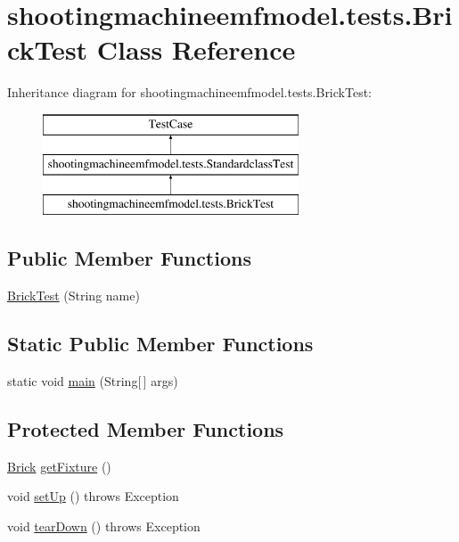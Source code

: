 \hypertarget{classshootingmachineemfmodel_1_1tests_1_1_brick_test}{\section{shootingmachineemfmodel.\-tests.\-Brick\-Test Class Reference}
\label{classshootingmachineemfmodel_1_1tests_1_1_brick_test}
}
Inheritance diagram for shootingmachineemfmodel.\-tests.\-Brick\-Test\-:\begin{figure}[H]
\begin{center}
\leavevmode
\includegraphics[height=3.000000cm]{classshootingmachineemfmodel_1_1tests_1_1_brick_test}
\end{center}
\end{figure}
\subsection*{Public Member Functions}
\begin{DoxyCompactItemize}
\item 
\hyperlink{classshootingmachineemfmodel_1_1tests_1_1_brick_test_af4cc39c74c39df3bd29125799042fa22}{Brick\-Test} (String name)
\end{DoxyCompactItemize}
\subsection*{Static Public Member Functions}
\begin{DoxyCompactItemize}
\item 
static void \hyperlink{classshootingmachineemfmodel_1_1tests_1_1_brick_test_a3494e2e2a902c7d04dae562d5d454c03}{main} (String\mbox{[}$\,$\mbox{]} args)
\end{DoxyCompactItemize}
\subsection*{Protected Member Functions}
\begin{DoxyCompactItemize}
\item 
\hyperlink{interfaceshootingmachineemfmodel_1_1_brick}{Brick} \hyperlink{classshootingmachineemfmodel_1_1tests_1_1_brick_test_ab1fd810c925d922304ab3b6521e17518}{get\-Fixture} ()
\item 
void \hyperlink{classshootingmachineemfmodel_1_1tests_1_1_brick_test_aebdb8e54bb40af8456d17e7aa91c0aa9}{set\-Up} ()  throws Exception 
\item 
void \hyperlink{classshootingmachineemfmodel_1_1tests_1_1_brick_test_a5ab4e32b04df280009d9e95490976538}{tear\-Down} ()  throws Exception 
\end{DoxyCompactItemize}
